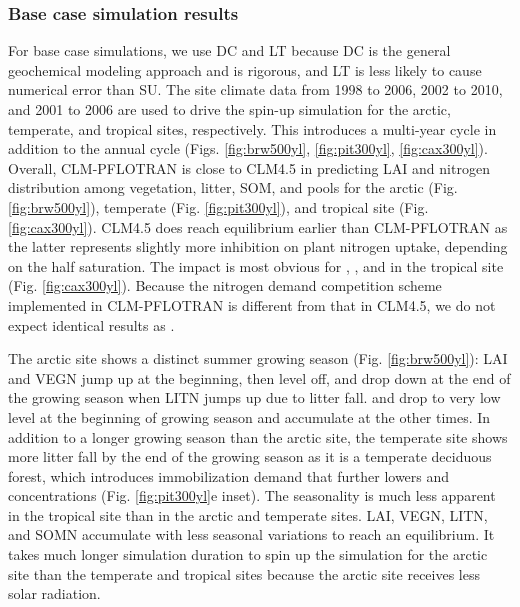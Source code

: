 \documentclass[gmd, manuscript]{copernicus}
\begin{document}
\subsubsection{Base case simulation results}
For base case simulations, we use DC  and LT because DC is the
general geochemical modeling approach and is rigorous, and LT is less likely to
cause numerical error than SU. The site climate data from 1998 to 2006, 2002 to
2010, and 2001 to 2006  are used to drive the spin-up simulation for the arctic,
temperate, and tropical sites, respectively. This introduces a multi-year cycle
in addition to the annual cycle (Figs. \ref{fig:brw500yl}, \ref{fig:pit300yl},
\ref{fig:cax300yl}). Overall, CLM-PFLOTRAN is close to CLM4.5 in
predicting LAI and nitrogen distribution among vegetation, litter, SOM,
 and  pools for the arctic (Fig. \ref{fig:brw500yl}),
temperate (Fig. \ref{fig:pit300yl}), and tropical site (Fig. \ref{fig:cax300yl}). %
CLM4.5 does reach equilibrium earlier than CLM-PFLOTRAN as the latter represents 
slightly more inhibition on plant nitrogen uptake, depending on the half
saturation. The impact is most obvious for , , and
 in the tropical site (Fig. \ref{fig:cax300yl}). Because the
nitrogen demand competition scheme implemented in CLM-PFLOTRAN is different
from that in CLM4.5, we do not expect identical results as \citet{Fang2013}. 

The arctic site shows a distinct summer growing season (Fig.
\ref{fig:brw500yl}): LAI and VEGN jump up at the beginning, then level off, and
drop down at the end of the growing season when LITN jumps up due to litter fall.
 and  drop to very low level at the beginning of
growing season and accumulate at the other times. In addition to a longer growing
season than the arctic site, the temperate site shows more litter fall by the
end of the growing season as it is a temperate deciduous forest, which introduces
immobilization demand that further lowers  and 
concentrations (Fig. \ref{fig:pit300yl}e inset). The seasonality is much less
apparent in the tropical site than in the arctic and temperate sites. LAI,
VEGN, LITN, and SOMN accumulate with less seasonal variations to reach an
equilibrium. It takes much longer simulation duration to spin up the simulation
for the arctic site than the temperate and tropical sites because the arctic site
receives less solar radiation. 
\end{document}
